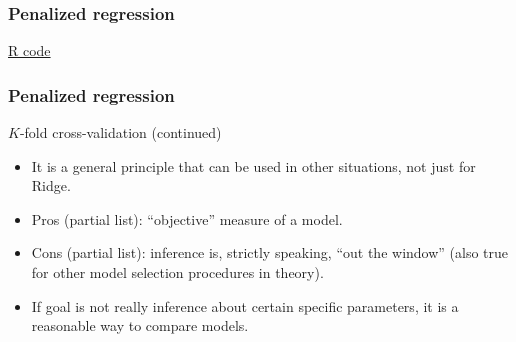 \documentclass[handout]{beamer}
\begin{document}


   \begin{frame}
   \frametitle{Penalized regression}
   \begin{center}
   \end{center}
   \href{http://www.stanford.edu/class/stats191/selection.html#bias-variance-tradeoff}{R code}
   \end{frame}


   \begin{frame} \frametitle{Penalized regression}

   \begin{block}
   {$K$-fold cross-validation   (continued)                  }
       \begin{itemize}

       \item It is a general principle that can be used in other situations, not just for Ridge.


       \item Pros (partial list): ``objective'' measure of a model.

       \item Cons (partial list): inference is, strictly speaking, ``out the window'' (also true for other model selection procedures in theory).

       \item If goal is not really inference about certain specific parameters, it is a reasonable way to compare models.
       \end{itemize}

   \end{block}
   \end{frame}
\end{document}
